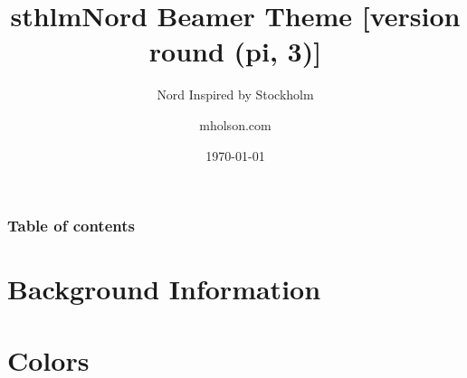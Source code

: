 \documentclass[aspectratio=169, sectionpages,codehl,bibref]{beamer}
\title{sthlmNord Beamer Theme [version round (pi, 3)]}
\subtitle{Nord Inspired by Stockholm}
\author{mholson.com}
\institute{School in Stockholm}
\date{\today}
\begin{document}
\titlepage%


\begin{frame}
	\frametitle{Table of contents}
	\tableofcontents
\end{frame}

\section{Background Information}









\section{Colors}





\end{document}
